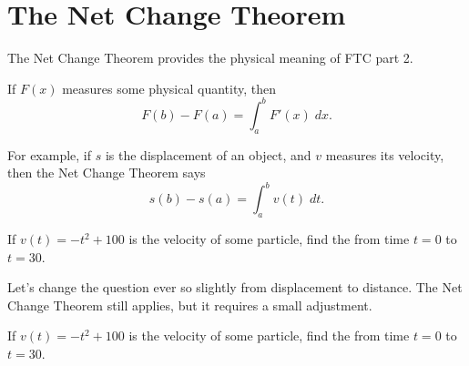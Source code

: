 \documentclass[../main.tex]{subfiles}
\begin{document}
 \section{The Net Change Theorem}
The Net Change Theorem provides the physical meaning of FTC part 2. 

\begin{thm}
  If \(F(x)\) measures some physical quantity, then
  \[
    F(b) - F(a) = \int_{a}^{b} F'(x) \;dx.
  \]

\end{thm}


For example, if \(s\) is the displacement of an object, and \(v\) measures its velocity, then the Net Change Theorem says
\[
  s(b) - s(a) = \int_{a}^{b} v(t) \;dt.
\]


\begin{example}
  If \(v(t) = -t^{2} + 100\) is the velocity of some particle, find the  from time \(t = 0\) to \(t = 30\).

\end{example}
\clearpage

Let's change the question ever so slightly from  displacement to  distance. The Net Change Theorem still applies, but it requires a small adjustment. 
\begin{exercise}
  If \(v(t) = -t^{2} + 100\) is the velocity of some particle, find the  from time \(t = 0\) to \(t = 30\).

\end{exercise}
\end{document}
